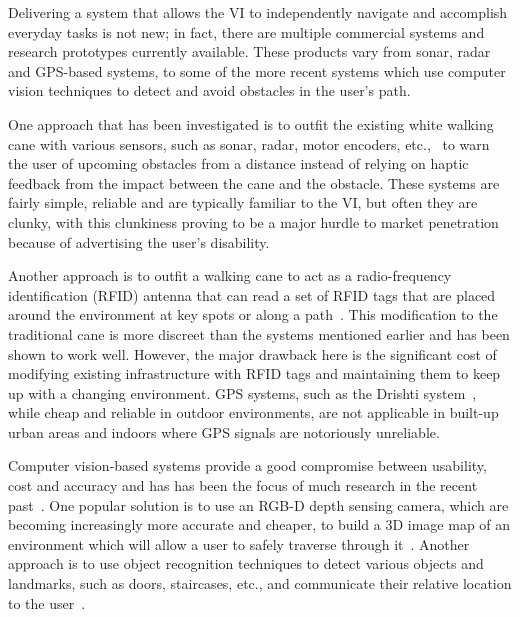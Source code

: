 \documentclass[format=sigconf, review=true, screen=true, anonymous=true]{acmart}
\begin{document}

Delivering a system that allows the VI to independently navigate and accomplish everyday tasks is not new; in fact, there are multiple commercial systems and research prototypes currently available. These products vary from sonar, radar and GPS-based systems, to some of the more recent systems which use computer vision techniques to detect and avoid obstacles in the user's path. 

One approach that has been investigated is to outfit the existing white walking cane with various sensors, such as sonar, radar, motor encoders, etc.,~\cite{ulrich1997, marion2008batcane} to warn the user of upcoming obstacles from a distance instead of relying on haptic feedback from the impact between the cane and the obstacle. These systems are fairly simple, reliable and are typically familiar to the VI, but often they are clunky, with this clunkiness proving to be a major hurdle to market penetration because of advertising the user's disability. 

Another approach is to outfit a walking cane to act as a radio-frequency identification (RFID) antenna that can read a set of RFID tags that are placed around the environment at key spots or along a path~\cite{faria2010electronic, willis2005}. This modification to the traditional cane is more discreet than the systems mentioned earlier and has been shown to work well. However, the major drawback here is the significant cost of modifying existing infrastructure with RFID tags and maintaining them to keep up with a changing environment. GPS systems, such as the Drishti system~\cite{ran2004drishti}, while cheap and reliable in outdoor environments, are not applicable in built-up urban areas and indoors where GPS signals are notoriously unreliable. 

Computer vision-based systems provide a good compromise between usability, cost and accuracy and has has been the focus of much research in the recent past~\cite{manduchi2014last}. One popular solution is to use an RGB-D depth sensing camera, which are becoming increasingly more accurate and cheaper, to build a 3D image map of an environment which will allow a user to safely traverse through it~\cite{lee2015, rodriguez2012obstacle}. Another approach is to use object recognition techniques to detect various objects and landmarks, such as doors, staircases, etc., and communicate their relative location to the user~\cite{tian2013b}.%
\end{document}
